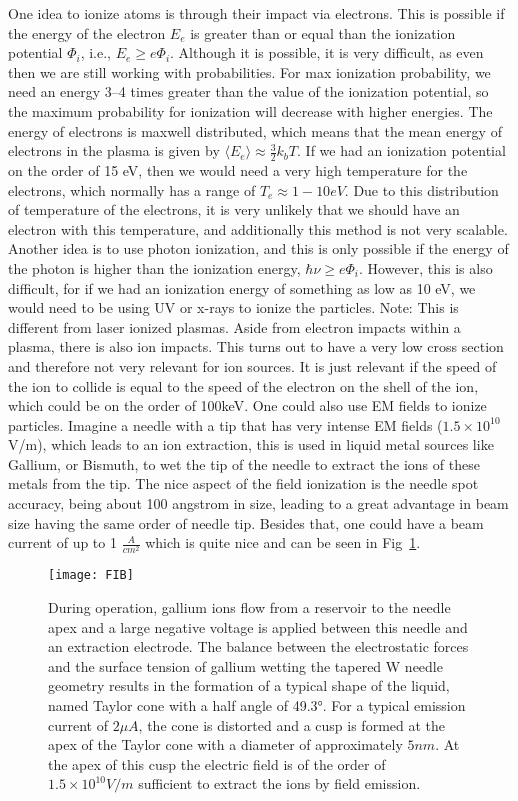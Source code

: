 One idea to ionize atoms is through their impact via electrons.
This is possible if the energy of the electron $E_e$ is greater than or equal than the ionization potential $\Phi_i$, i.e., $E_e \geq e\Phi_i$.
Although it is possible, it is very difficult, as even then we are still working with probabilities.
For max ionization probability, we need an energy 3--4 times greater than the value of the ionization potential, so the maximum probability for ionization will decrease with higher energies.
The energy of electrons is maxwell distributed, which means that the mean energy of electrons in the plasma is given by $\langle E_e \rangle \approx \frac{3}{2} k_b T$.
If we had an ionization potential on the order of 15 eV, then we would need a very high temperature for the electrons, which normally has a range of $T_e \approx 1-10 eV$.
Due to this distribution of temperature of the electrons, it is very unlikely that we should have an electron with this temperature, and additionally this method is not very scalable.
Another idea is to use photon ionization, and this is only possible if the energy of the photon is higher than the ionization energy, $\hbar \nu \geq e\Phi_i$.
However, this is also difficult, for if we had an ionization energy of something as low as 10 eV, we would need to be using UV or x-rays to ionize the particles.
Note: This is different from laser ionized plasmas.
Aside from electron impacts within a plasma, there is also ion impacts.
This turns out to have a very low cross section and therefore not very relevant for ion sources.
It is just relevant if the speed of the ion to collide is equal to the speed of the electron on the shell of the ion, which could be on the order of 100keV. One could also use EM fields to ionize particles.
Imagine a needle with a tip that has very intense EM fields ($1.5\times 10^{10}$ V/m), which leads to an ion extraction, this is used in liquid metal sources like Gallium, or Bismuth, to wet the tip of the needle to extract the ions of these metals from the tip.
The nice aspect of the field ionization is the needle spot accuracy, being about 100 angstrom in size, leading to a great advantage in beam size having the same order of needle tip.
Besides that, one could have a beam current of up to 1 $\frac{A}{cm^2}$ which is quite nice and can be seen in Fig~\ref{fig:fib}.
\begin{figure}

	\centering
	\texttt{[image: FIB]}
	\caption{During operation, gallium ions flow from a reservoir to the needle apex and a large negative voltage is applied between this needle and an extraction electrode. The balance between the electrostatic forces and the surface tension of gallium wetting the tapered W needle geometry results in the formation of a typical shape of the liquid, named Taylor cone with a half angle of 49.3°. For a typical emission current of $2\mu A$, the cone is distorted and a cusp is formed at the apex of the Taylor cone with a diameter of approximately $5 nm$. At the apex of this cusp the electric field is of the order of $1.5\times 10^{10} V/m$ sufficient to extract the ions by field emission.}
	\label{fig:fib}
\end{figure}

